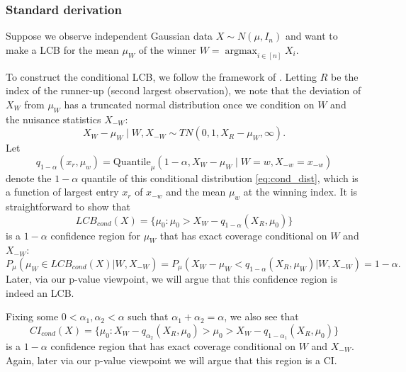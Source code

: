 \documentclass{article}
\DeclareMathOperator*{\argmax}{argmax}
\begin{document}
\begin{appendix}
\subsubsection{Standard derivation}

Suppose we observe independent Gaussian data $X \sim N(\mu, I_n)$ and want to make a LCB for the mean $\mu_W$ of the winner $W = \argmax_{i \in [n]} X_i$. 

To construct the conditional LCB, we follow the framework of \cite{Fithian2017}. Letting $R$ be the index of the runner-up (second largest observation), we note that the deviation of $X_{W}$ from $\mu_{W}$ has a truncated normal distribution once we condition on $W$ and the nuisance statistics $X_{-W}$:
\begin{equation}
    \label{eq:cond_dist}
    X_W - \mu_W \mid W, X_{-W} \sim TN(0, 1, X_{R} - \mu_{W}, \infty).
\end{equation}
Let
\begin{equation}
    \label{eq:cond_quantile}
    q_{1-\alpha}(x_r, \mu_w) = \text{Quantile}_{\mu}(1-\alpha, X_W -  \mu_{W} \mid W=w, X_{-w} = x_{-w})
\end{equation}
denote the $1-\alpha$ quantile of this conditional distribution \eqref{eq:cond_dist}, which is a function of largest entry $x_r$ of $x_{-w}$ and the mean $\mu_w$ at the winning index. It is straightforward to show that
\begin{equation}
\label{eq:cond_lcb}
     LCB_{cond}(X) = \{\mu_0 : \mu_0 > X_{W} - q_{1-\alpha}(X_R, \mu_0)  \} 
\end{equation}
is a $1-\alpha$ confidence region for $\mu_{W}$ that has exact coverage conditional on $W$ and  $X_{-W}$:
\begin{equation*}
    P_{\mu}( \mu_{W} \in LCB_{cond}(X) | W, X_{-W})  = P_{\mu}( X_W - \mu_W < q_{1-\alpha}(X_R,\mu_{W}) |W, X_{-W}) = 1-\alpha.
\end{equation*}
Later, via our p-value viewpoint, we will argue that this confidence region is indeed an LCB. 

Fixing some $0 < \alpha_1, \alpha_2 < \alpha$ such that $\alpha_1 + \alpha_2 = \alpha$, we also see that 
\begin{equation}
    \label{eq:cond_ci}
        CI_{cond}(X) = \{\mu_0 : X_W - q_{\alpha_2}(X_R, \mu_0) > \mu_0 > X_W - q_{1-\alpha_1}(X_R, \mu_0)  \} 
\end{equation}
is a $1-\alpha$ confidence region that has exact coverage conditional on $W$ and $X_{-W}$. Again, later via our p-value viewpoint we will argue that this region is a CI. 


\end{appendix}
\end{document}
